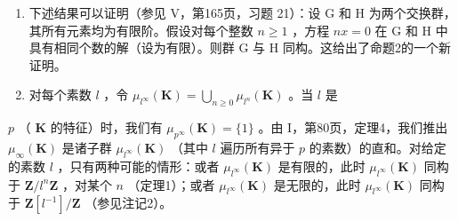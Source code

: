 \begin{enumerate}
\def\labelenumi{\arabic{enumi})}
\setcounter{enumi}{1}
\item
  下述结果可以证明（参见 V，第165页，习题 21）：设 G 和 H 为两个交换群，其所有元素均为有限阶。假设对每个整数 \(n \geqslant 1\) ，方程 \(nx = 0\) 在 G 和 H 中具有相同个数的解（设为有限）。则群 G 与 H 同构。这给出了命题2的一个新证明。
\item
  对每个素数 \(l\) ，令 \(\mu_{l^{\infty}}(\mathbf{K}) = \bigcup_{n\geqslant 0}\mu_{l^{n}}(\mathbf{K})\) 。当 \(l\) 是
\end{enumerate}

\(p\) （ \(\mathbf{K}\) 的特征）时，我们有 \(\mu_{p^{\infty}}(\mathbf{K}) = \{1\}\) 。由 I，第80页，定理4，我们推出 \(\mu_{\infty}(\mathbf{K})\) 是诸子群 \(\mu_{l^{\infty}}(\mathbf{K})\) （其中 \(l\) 遍历所有异于 \(p\) 的素数）的直和。对给定的素数 \(l\) ，只有两种可能的情形：或者 \(\mu_{l^{\infty}}(\mathbf{K})\) 是有限的，此时 \(\mu_{l^{\infty}}(\mathbf{K})\) 同构于 \(\mathbf{Z}/l^{n}\mathbf{Z}\) ，对某个 \(n\) （定理1）；或者 \(\mu_{l^{\infty}}(\mathbf{K})\) 是无限的，此时 \(\mu_{l^{\infty}}(\mathbf{K})\) 同构于 \(\mathbf{Z}[l^{-1}]/\mathbf{Z}\) （参见注记2）。

